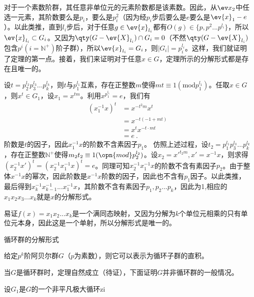 对于一个素数阶群，其任意非单位元的元素阶数都是该素数。因此，从$\ev x_2$中任选一元素，其阶数要么是$p_i$，要么是$p_i^2$（因为经$p_i$步后要么是$e$要么是$\ev{x}_1-e$）。以此类推，直到$l_i$步后，对于任意$g\in\ev{x}_{l_i}$都有$O(g)\in\{p,p^2...p^{l_i}\}$，所以$\ev{x}_{l_i}\subset G_i$。又因为$\qty (G-\ev{X}_{l_i})\cap G_i=0$（不然$\qty (G-\ev{X}_{l_i})$包含$p^i(i=\mathbb N^{+})$阶子群），所以$\ev{x}_{l_i}=G_i$，则$|G_i|=p_i^{l_i}$。这样，我们就证明了定理的第一点。接着，我们来证明对于任意$x\in G$，定理所示的分解形式都是存在且唯一的。

设$t=p_2^{l_2}p_3^{l_3}...p_k^{l_k}$，则$t$与$p_1^{l_1}$互素，存在正整数$m$使得$mt\equiv 1(\mathrm {mod} p_1^{l_1})$。任取$x\in G$，则$x^t\in G_1$，设$x_1=x^{tm}$。利用$x^{p_1^{l_1}}=e$，我们有
\begin{equation}
\begin{aligned}
(x_1^{-1}x)^t&=x^{-t^2m}x^t\\
&=x^{-t(-1+mt)}\\
&=x^tx^{-t\cdot mt}\\
&=e~.
\end{aligned}
\end{equation}
阶数是$t$的因子，因此$x_1^{-1}x$的阶数不含素因子$p_1$。
仿照上述过程，设$t_2=p_1^{l_1}p_3^{l_3}...p_k^{l_k}$，存在正整数$\mathbb N^{+}$使得$m_2t_2\equiv 1(\opn{mod}p_2^{l_2})$。设$x_2=x'^{t_2m},x'=x^{-1}x$，则求得$(x_2^{-1}x')^t=(x_2^{-1}x_1^{-1}x)^t=e$。同理可知$x_2^{-1}x_1^{-1}x$的阶数不含有素因子$p_2$。由于整体$x^{-1}x$的幂次，因此阶数是$x^{-1}x$阶数的因子，因此也不含有$p_1$因子。以此类推，最后得到$x_k^{-1}x_{k-1}^{-1}...x_1^{-1}x$，其阶数不含有素因子$p_1,p_2...p_k$，因此为1,相应的$x_1x_2x_3...x_k$就是$x$的分解形式。

易证$f(x)=x_1x_2...x_k$是一个满同态映射，又因为分解为$k$个单位元相乘的只有单位元本身，因此这是一个单射，所以分解形式是唯一的。

\begin{example}{循环群的分解形式}

\end{example}

\begin{theorem}{}
给定$p^k$阶阿贝尔群$G$（$p$为素数），则它可以表示为循环子群的直积。
\end{theorem}
当$G$是循环群时，定理自然成立（待证），下面证明$G$并非循环群的一般情况。

设$G_1$是$G$的一个非平凡极大循环zi